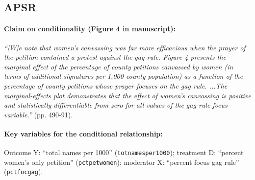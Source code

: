 \documentclass[12pt]{article}
\begin{document}
\subsection{\citet{Carpenter2014} APSR} \label{carpenter}

\paragraph{Claim on conditionality (Figure 4 in manuscript):} \emph{``[W]e note that
  women’s canvassing was far more efficacious when the prayer of the
  petition contained a protest against the gag rule. Figure 4 presents
  the marginal effect of the percentage of county petitions canvassed
  by women (in terms of additional signatures per 1,000 county
  population) as a function of the percentage of county petitions
  whose prayer focuses on the gag rule. ...The marginal-effects plot
  demonstrates that the effect of women’s canvassing is positive and
  statistically differentiable from zero for all values of the
  gag-rule focus variable.''} (pp. 490-91). 

\paragraph{Key variables for the conditional relationship:} Outcome Y:
``total names per 1000'' (\texttt{totnamesper1000}); treatment D: ``percent women's only petition''
(\texttt{pctpetwomen}); moderator X: ``percent focus gag rule'' (\texttt{pctfocgag}). 

\clearpage
\end{document}
